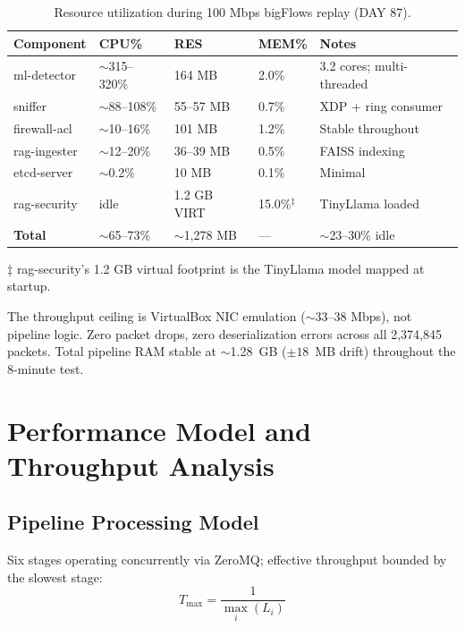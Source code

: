 \documentclass[11pt,a4paper]{article}
\begin{document}
\begin{table}[h]
\centering
\caption{Resource utilization during 100 Mbps bigFlows replay (DAY 87).}
\label{tab:resources}
\begin{tabular}{lllll}
\toprule
\textbf{Component} & \textbf{CPU\%} & \textbf{RES} & \textbf{MEM\%} & \textbf{Notes} \\
\midrule
ml-detector       & ${\sim}$315--320\% & 164 MB    & 2.0\%  & 3.2 cores; multi-threaded \\
sniffer           & ${\sim}$88--108\%  & 55--57 MB & 0.7\%  & XDP + ring consumer \\
firewall-acl      & ${\sim}$10--16\%   & 101 MB    & 1.2\%  & Stable throughout \\
rag-ingester      & ${\sim}$12--20\%   & 36--39 MB & 0.5\%  & FAISS indexing \\
etcd-server       & ${\sim}$0.2\%      & 10 MB     & 0.1\%  & Minimal \\
rag-security      & idle               & 1.2 GB VIRT & 15.0\%$^{\ddagger}$ & TinyLlama loaded \\
\midrule
\textbf{Total}    & ${\sim}$65--73\%   & ${\sim}$1,278 MB & --- & ${\sim}$23--30\% idle \\
\bottomrule
\end{tabular}
\medskip
\footnotesize{$\ddagger$ rag-security's 1.2 GB virtual footprint is the TinyLlama model
mapped at startup.}
\end{table}

The throughput ceiling is VirtualBox NIC emulation (${\sim}$33--38 Mbps), not pipeline
logic. Zero packet drops, zero deserialization errors across all 2,374,845 packets. Total
pipeline RAM stable at ${\sim}$1.28~GB (${\pm}18$~MB drift) throughout the 8-minute test.

\section{Performance Model and Throughput Analysis}

\subsection{Pipeline Processing Model}

Six stages operating concurrently via ZeroMQ; effective throughput bounded by the slowest
stage:
\begin{equation}
  T_{\max} = \frac{1}{\max_i(L_i)}
\end{equation}
\end{document}
